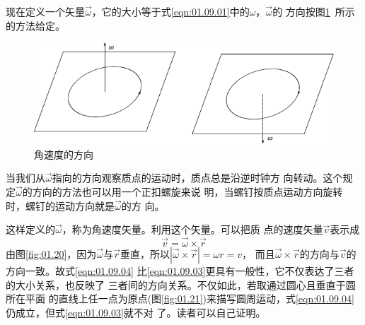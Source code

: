 现在定义一个矢量$\vec{\omega}$，它的大小等于式\eqref{eqn:01.09.01}中的$\omega$，$ \vec{\omega}$的
方向按图\ref{fig:01.19}~所示的方法给定。
\begin{figure}[!h]
  \includegraphics{figure/fig01.19}
  \caption{角速度的方向}
  \label{fig:01.19}
  \vspace{-1.2em}
\end{figure}

\noindent 当我们从$ \vec{\omega}$指向的方向观察质点的运动时，质点总是沿逆时钟方
向转动。这个规定$  \vec{\omega}$的方向的方法也可以用一个正扣螺旋来说
明，当螺钉按质点运动方向旋转时，螺钉的运动方向就是$  \vec{\omega}$的方
向。

这样定义的$  \vec{\omega}$，称为角速度矢量。利用这个矢量。可以把质
点的速度矢量$\vec{v}$表示成
\begin{equation}\label{eqn:01.09.04}
  \vec{v}=  \vec{\omega}\times \vec{r}
\end{equation}
由图\ref{fig:01.20}，因为$  \vec{\omega}$与$\vec{r}$垂直，所以$|  \vec{\omega}\times\vec{r}|=\omega r=v$，
而且$  \vec{\omega}\times\vec{r}$的方向与$\vec{v}$的方向一致。故式\eqref{eqn:01.09.04}
比\eqref{eqn:01.09.03}更具有一般性，它不仅表达了三者的大小关系，也反映了
三者间的方向关系。不仅如此，若取通过圆心且垂直于圆所在平面
的直线上任一点为原点(图\ref{fig:01.21})来描写圆周运动，式\eqref{eqn:01.09.04}仍成立，但式\eqref{eqn:01.09.03}就不对
\clearpage
\noindent 了。读者可以自己证明。


